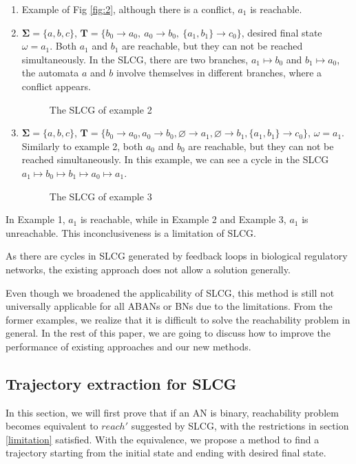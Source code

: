 \documentclass[runningheads]{llncs}
\newcommand{\acm}[3]{#1\rightarrow#2}
\begin{document}
\begin{enumerate}
\item Example of %
Fig \ref{fig:2}, although there is a conflict, $a_1$ is reachable.
\item $\mathbf{\Sigma}=\{a,b,c\}$, $\mathbf{T}=\{\acm{b_0}{a_0}{a_1},\ \acm{a_0}{b_0}{b_1},\ \acm{\{a_1,b_1\}}{c_0}{c_1}\}$,  desired final state $\omega=a_1$. Both $a_1$ and $b_1$ are reachable, but they can not be reached simultaneously. In the SLCG, there are two branches, $a_1\mapsto b_0$ and $b_1\mapsto a_0$, the automata $a$ and $b$ involve themselves in different branches, where a conflict appears.
\begin{figure}[ht]
\centering

\caption{The SLCG of example 2}
\label{fig:3}
\end{figure}
\item $\mathbf{\Sigma}=\{a,b,c\}$, $\mathbf{T}=\{\acm{b_0}{a_0}{a_1},\acm{a_0}{b_0}{b_1},\acm{\varnothing}{a_1}{a_0}, \acm{\varnothing}{b_1}{b_0},\acm{\{a_1,b_1\}}{c_0}{c_1}\}$, $\omega=a_1$. Similarly to example 2, both $a_0$ and $b_0$ are reachable, but they can not be reached simultaneously. In this example, we can see a cycle in the SLCG $a_1\mapsto b_0\mapsto b_1 \mapsto a_0\mapsto a_1$.
\begin{figure}[ht]
\centering

\caption{The SLCG of example 3}
\label{fig:4}
\end{figure}

\end{enumerate}

In Example 1, $a_1$ is reachable, while in Example 2 and Example 3, $a_1$ is unreachable. This inconclusiveness is a limitation of SLCG.

As there are cycles in SLCG generated by feedback loops in biological regulatory networks, the existing approach does not allow a solution generally.

Even though we broadened the applicability of SLCG, this method is still not universally applicable for all ABANs or BNs due to the limitations. From the former examples, we realize that it is difficult to solve the reachability problem in general. In the rest of this paper, we are going to discuss how to improve the performance of existing approaches and our new methods. 

\subsection{Trajectory extraction for SLCG}\label{sectExtract}
In this section, we will first prove that if an AN is binary, reachability problem becomes equivalent to $reach'$ suggested by SLCG, with the restrictions in section \ref{limitation} satisfied. With the equivalence, we propose a method to find a trajectory starting from the initial state and ending with desired final state.
\end{document}
